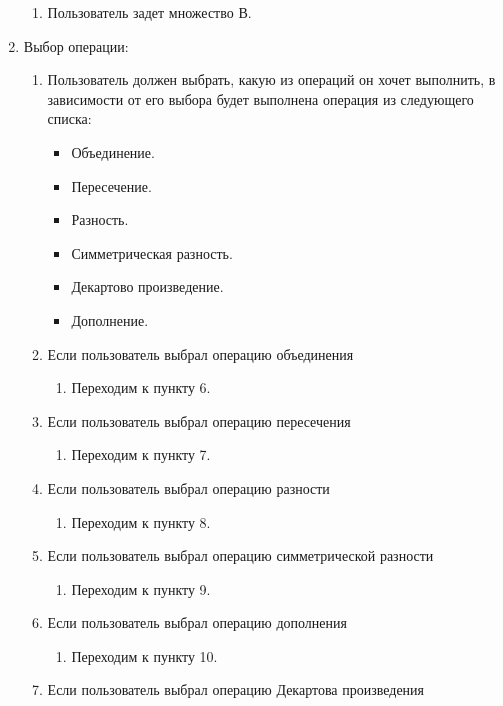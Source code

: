 \documentclass[a4paper,12pt]{extarticle}
\begin{document}
\begin{enumerate}
\begin{enumerate}[label*=\arabic*.]
    \item Пользователь задет множество В.
  \end{enumerate}
  \item Выбор операции:
  \begin{enumerate}[label*=\arabic*.]
    \item Пользователь должен выбрать, какую из операций он хочет выполнить, в зависимости от его выбора будет выполнена операция из следующего списка:
    \begin{itemize}
      \item Объединение.
      \item Пересечение.
      \item Разность.
      \item Симметрическая разность.
      \item Декартово произведение.
      \item Дополнение.
    \end{itemize}
    \item Если пользователь выбрал операцию объединения
    \begin{enumerate}[label*=\arabic*.]
      \item Переходим к пункту 6.
    \end{enumerate}
    \item Если пользователь выбрал операцию пересечения
    \begin{enumerate}[label*=\arabic*.]
      \item Переходим к пункту 7.
    \end{enumerate}
    \item Если пользователь выбрал операцию разности
    \begin{enumerate}[label*=\arabic*.]
      \item Переходим к пункту 8.
    \end{enumerate}
    \item Если пользователь выбрал операцию симметрической разности
    \begin{enumerate}[label*=\arabic*.]
      \item Переходим к пункту 9.
    \end{enumerate}
    \item Если пользователь выбрал операцию дополнения
    \begin{enumerate}[label*=\arabic*.]
      \item Переходим к пункту 10.
    \end{enumerate}
    \item Если пользователь выбрал операцию Декартова произведения

\end{enumerate}
\end{enumerate}
\end{document}
